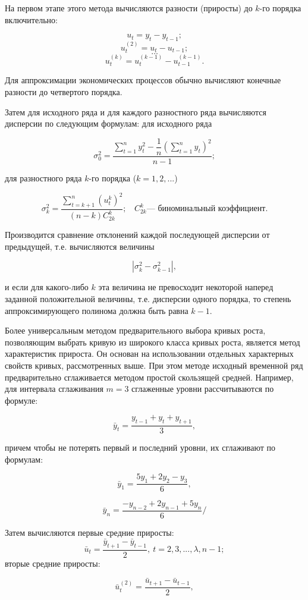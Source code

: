 На первом этапе этого метода вычисляются разности (приросты) до $k$-го порядка включительно:

\[ u_t =y_t - y_{t-1};\]
\[ u_t^{(2)} =u_t - u_{t-1}; \]
\[ \dots \]
\[u_t^{(k)} =u_t^{(k-1)} - u_{t-1}^{(k-1)}. \]

Для аппроксимации экономических процессов обычно вычисляют конечные разности до четвертого порядка.

Затем для исходного ряда и для каждого разностного ряда вычисляются дисперсии по следующим формулам: для исходного ряда

\[ \sigma_0^2 = \dfrac{\sum\limits_{t=1}^{n}y_t^2 - \dfrac{1}{n}\left(\sum\limits_{t=1}^{n}y_t\right)^2}{n-1}; \]

для разностного ряда $k$-го порядка ($k = 1, 2,...$)

\[ \sigma_k^2 =\dfrac{\sum\limits_{t=k+1}^{n}(u_t^k)^2}{(n-k)C_{2k}^k}; \ \ \ \ C_{2k}^k \text{--- биноминальный коэффициент.} \]

Производится сравнение отклонений каждой последующей дисперсии от предыдущей, т.е. вычисляются величины

\[ |\sigma_k^2 - \sigma_{k-1}^2|, \]

и если для какого-либо $k$ эта величина не превосходит некоторой наперед заданной положительной величины, т.е. дисперсии одного порядка, то степень аппроксимирующего полинома должна быть равна $k - 1$.

Более универсальным методом предварительного выбора кривых роста, позволяющим выбрать кривую из широкого класса кривых роста, является метод характеристик прироста. Он основан на использовании отдельных характерных свойств кривых, рассмотренных выше. При этом методе исходный временной ряд предварительно сглаживается методом простой скользящей средней. Например, для интервала сглаживания $m = 3$ сглаженные уровни рассчитываются по формуле:

\[ \bar{y}_t = \dfrac{y_{t-1} + y_t + y_{t+1}}{3}, \]

причем чтобы не потерять первый и последний уровни, их сглаживают по формулам:

\[ \bar{y}_1 = \dfrac{5y_{1} + 2y_2 - y_{3}}{6}, \]

\[ \bar{y}_n = \dfrac{-y_{n-2} + 2y_{n-1} + 5y_{n}}{6}/ \]

Затем вычисляются первые средние приросты:
\[ \bar{u}_t = \dfrac{\bar{y}_{t+1} - \bar{y}_{t-1}}{2},\ t=2,3,...,\lambda,n-1; \]
вторые средние приросты:
 
\[ \bar{u}_t^{(2)} = \dfrac{\bar{u}_{t+1} - \bar{u}_{t-1}}{2}, \]
 
